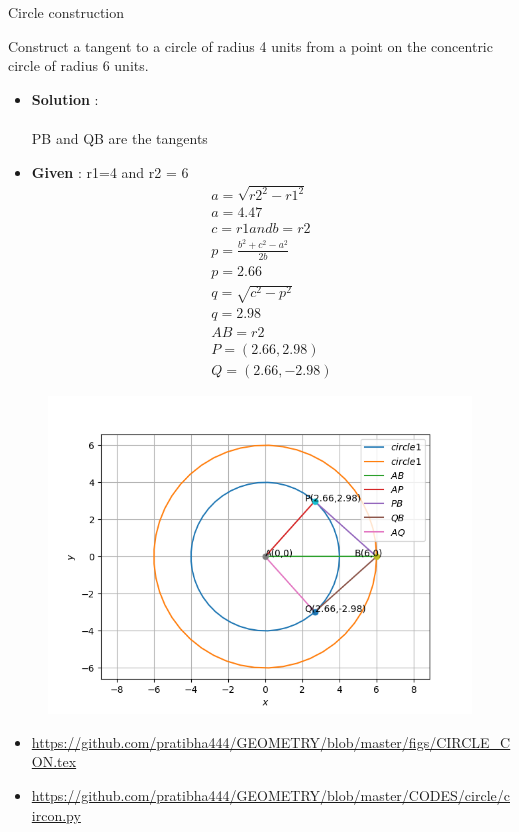 \begin{frame}{Circle construction}

 Construct a tangent to a circle of radius 4 units
from a point on the concentric circle of radius
6 units.\\
\begin{itemize}
\item\textbf{Solution} :\\
\\  PB and QB are the tangents 
\end{itemize}
\seti
\end{frame}

\begin{frame}
\begin{itemize}
\item \textbf{Given} : r1=4 and r2 = 6\\
\begin{align*}
a=\sqrt{r2^2 - r1^2}\\
a=4.47\\
c=r1 and b=r2\\
p=\frac{b^2+c^2-a^2}{2b}\\
p=2.66\\
q=\sqrt{c^2 - p^2}\\
q=2.98\\
AB = r2 \\
P = (2.66,2.98)\\
Q = (2.66,-2.98)
\end{align*}
\end{itemize}

\end{frame}


\begin{frame}
\begin{figure}
\includegraphics[scale=.4]{./CODES/circle/CIR_CON.png}
\end{figure}
\begin{itemize}
\item \url{https://github.com/pratibha444/GEOMETRY/blob/master/figs/CIRCLE_CON.tex}  \\
\item \url{https://github.com/pratibha444/GEOMETRY/blob/master/CODES/circle/circon.py}
\end{itemize}
\end{frame}
